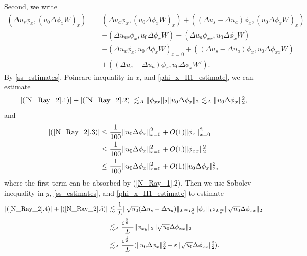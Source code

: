 \documentclass[reqno, 11pt]{amsart}
\theoremstyle{plain}
\theoremstyle{definition}
\theoremstyle{remark}
\numberwithin{equation}{section}
\begin{document}
Second, we write
\begin{equation}\label{N_Ray_2}
\begin{aligned}
(\Delta u_s \phi_x, (u_0 \Delta\phi_x W)_x) =& (\Delta u_a \phi_x,(u_0 \Delta\phi_x W)_x) + ((\Delta u_s - \Delta u_a) \phi_x, (u_0 \Delta\phi_x W)_x)\\
=& -(\Delta u_{ax} \phi_x, u_0 \Delta\phi_x W) - (\Delta u_a \phi_{xx},u_0 \Delta\phi_x W)\\
&- (\Delta u_a \phi_{x},u_0 \Delta\phi_x W)_{x = 0} + ((\Delta u_s - \Delta u_a) \phi_x, u_0 \Delta\phi_{xx} W)\\
&+ ((\Delta u_s - \Delta u_a) \phi_x, u_0 \Delta\phi_x W').
\end{aligned}
\end{equation}
By \eqref{ss_estimates}, Poincare inequality in $x$, and \eqref{phi_x_H1_estimate}, we can estimate
\begin{equation}\label{N_Ray_2_1}
\begin{aligned}
|(\ref{N_Ray_2}.1)| + |(\ref{N_Ray_2}.2)| \lesssim_A \| \phi_{xx}\|_2 \| u_0 \Delta\phi_x \|_2 \lesssim_A \| u_0 \Delta\phi_x \|_2^2,
\end{aligned}
\end{equation}
and
\begin{equation}\label{N_Ray_2_2}
\begin{aligned}
|(\ref{N_Ray_2}.3)| &\le \frac{1}{100} \| u_0 \Delta\phi_x \|_{x=0}^2 + O(1) \| \phi_x\|_{x=0}^2\\
&\le \frac{1}{100} \| u_0 \Delta\phi_x \|_{x=0}^2 + O(1)\|\phi_{xx}\|_2^2\\
&\le \frac{1}{100} \| u_0 \Delta\phi_x \|_{x=0}^2 + O(1) \| u_0 \Delta\phi_x \|_2^2,
\end{aligned}
\end{equation}
where the first term can be absorbed by (\ref{N_Ray_1}.2). Then we use Sobolev inequality in $y$, \eqref{ss_estimates}, and \eqref{phi_x_H1_estimate} to estimate
\begin{equation}\label{N_Ray_2_3}
\begin{aligned}
|(\ref{N_Ray_2}.4)| + |(\ref{N_Ray_2}.5)| &\lesssim \frac{1}{L}  \| \sqrt{u_0} (\Delta u_s - \Delta u_a) \|_{L^\infty_x L^2_y}  \|\phi_x\|_{L^2_x L^\infty_y} \| \sqrt{u_0} \Delta\phi_{xx} \|_2\\
& \lesssim_A \frac{\varepsilon^{\frac{5}{6}-}}{L}\| \phi_{xy}\|_2 \| \sqrt{u_0} \Delta\phi_{xx} \|_2\\
& \lesssim_A \frac{\varepsilon^{\frac{1}{3}-}}{L} (\| u_0 \Delta\phi_x \|_2^2 + \varepsilon  \| \sqrt{u_0} \Delta\phi_{xx} \|_2^2).
\end{aligned}
\end{equation}
\end{document}
